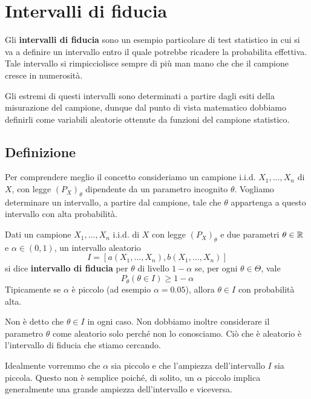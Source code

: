 \chapter{Intervalli di fiducia}
Gli \textbf{intervalli di fiducia} sono un esempio particolare di test statistico in cui si va a
definire un intervallo entro il quale potrebbe ricadere la probabilita effettiva. Tale intervallo
si rimpicciolisce sempre di più man mano che che il campione cresce in numerosità.

Gli estremi di questi intervalli sono determinati a partire dagli esiti della misurazione del
campione, dunque dal punto di vista matematico dobbiamo definirli come variabili aleatorie
ottenute da funzioni del campione statistico.

\section{Definizione}
Per comprendere meglio il concetto consideriamo un campione i.i.d. $X_1, \dots, X_n$ di $X$, con
legge $(P_X)_\theta$ dipendente da un parametro incognito $\theta$. Vogliamo determinare un
intervallo, a partire dal campione, tale che $\theta$ appartenga a questo intervallo con alta
probabilità.

\begin{definition}
	Dati un campione $X_1, \dots, X_n$ i.i.d. di $X$ con legge $(P_X)_\theta$ e due parametri
	$\theta \in \mathbb{R}$ e $\alpha \in (0,1)$, un intervallo aleatorio
	\[ I = [a(X_1, \dots, X_n), b(X_1, \dots, X_n)] \]
	si dice \textbf{intervallo di fiducia} per $\theta$ di livello $1-\alpha$ se, per ogni
	$\theta \in \Theta$, vale
	\[ P_\theta (\theta \in I) \geq 1 - \alpha \]
	Tipicamente se $\alpha$ è piccolo (ad esempio $\alpha = 0.05$), allora $\theta \in I$ con
	probabilità alta.
\end{definition}

\begin{observation}
	Non è detto che $\theta \in I$ in ogni caso. Non dobbiamo inoltre considerare il parametro
	$\theta$ come aleatorio solo perché non lo conosciamo. Ciò che è aleatorio è l'intervallo di
	fiducia che stiamo cercando.
\end{observation}

Idealmente vorremmo che $\alpha$ sia piccolo e che l'ampiezza dell'intervallo $I$ sia piccola.
Questo non è semplice poiché, di solito, un $\alpha$ piccolo implica generalmente una grande
ampiezza dell'intervallo e viceversa.